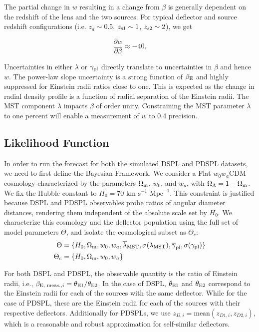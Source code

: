 \documentclass[a4paper,11pt]{article}
\begin{document}
The partial change in $w$ resulting in a change from $\beta$ is generally dependent on the redshift of the lens and the two sources. For typical deflector and source redshift configurations (i.e. $z_{d} \sim 0.5$, $z_{\rm s1} \sim 1$, $z_{\rm s2}\sim 2$), we get

\begin{equation}
    \frac{\partial w}{\partial \beta} \approx - 40.
\end{equation}

Uncertainties in either $\lambda$ or $\gamma_{\rm pl}$ directly translate to uncertainties in $\beta$ and hence $w$. The power-law slope uncertainty is a strong function of $\beta_{\rm E}$ and highly suppressed for Einstein radii ratios close to one. This is expected as the change in radial density profile is a function of radial separation of the Einstein radii. The MST component $\lambda$ impacts $\beta$ of order unity. Constraining the MST parameter $\lambda$ to one percent will enable a measurement of $w$ to $0.4$ precision.
\subsection{Likelihood Function}\label{sec:likelihood_fnc}
In order to run the forecast for both the simulated DSPL and PDSPL datasets, we need to first define the Bayesian Framework. We consider a Flat $w_0w_a$CDM cosmology characterized by the parameters $\Omega_{\rm m}$, $w_0$, and $w_a$, with $\Omega_{\rm \Lambda} = 1 - \Omega_{\rm m}$. We fix the Hubble constant to $H_0 = 70 \text{ km} \text{ s}^{-1} \text{ Mpc}^{-1}$. This constraint is justified because DSPL and PDSPL observables probe ratios of angular diameter distances, rendering them independent of the absolute scale set by $H_0$. We characterize this cosmology and the deflector population using the full set of model parameters $\Theta$, and isolate the cosmological subset as $\Theta_c$:
\begin{align}
    \Theta &= \{H_0, \Omega_{\rm m}, w_0, w_a, \overline{\lambda}_{\rm MST}, \sigma(\lambda_{\rm MST}), \overline{\gamma}_{\rm pl}, \sigma(\gamma_{\rm pl})\} \\
    \Theta_c &= \{H_0, \Omega_{\rm m}, w_0, w_a\}
\end{align}

For both DSPL and PDSPL, the observable quantity is the ratio of Einstein radii, i.e., $\beta_{\text{E, meas.}, i} = \theta_{\rm E1}/\theta_{\rm E2}$. In the case of DSPL, $\theta_{\rm E1}$ and $\theta_{\rm E2}$ correspond to the Einstein radii for each of the sources with the same deflector. While for the case of PDSPL, these are the Einstein radii for each of the sources with their respective deflectors. Additionally for PDSPLs, we use $z_{D,i} = \text{mean}(z_{D1,i}, z_{D2,i})$, which is a reasonable and robust approximation for self-similar deflectors. 
\end{document}
